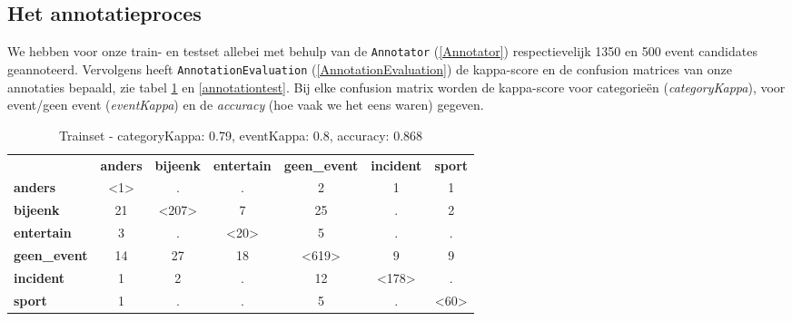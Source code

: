 \documentclass[a4paper,10pt,titlepage]{article}
\def\ss{\subsection}                          %
\def\ttt{\texttt}                             %
\def\it{\textit}                              %
\begin{document}
{{\ss{Het annotatieproces}

We hebben voor onze train- en testset allebei met behulp van de \ttt{Annotator} (\ref{Annotator})
respectievelijk 1350 en 500 event candidates geannoteerd. Vervolgens heeft \ttt{AnnotationEvaluation} (\ref{AnnotationEvaluation}) 
de kappa-score en de confusion matrices van onze annotaties bepaald, zie tabel \ref{annotationtrain} en \ref{annotationtest}.
Bij elke confusion matrix worden de kappa-score voor categorie\"en (\it{categoryKappa}), voor event/geen event (\it{eventKappa}) en
de \it{accuracy} (hoe vaak we het eens waren) gegeven.

\begin{table}[H]
\centering
\begin{tabular}{lcccccc}
 & \multicolumn{1}{l}{\textbf{anders}} & \multicolumn{1}{l}{\textbf{bijeenk}} & \multicolumn{1}{l}{\textbf{entertain}} & \multicolumn{1}{l}{\textbf{geen\_event}} & \multicolumn{1}{l}{\textbf{incident}} & \multicolumn{1}{l}{\textbf{sport}} \\ \cline{2-7} 
\multicolumn{1}{l|}{\textbf{anders}} & \multicolumn{1}{c|}{\textless1\textgreater} & \multicolumn{1}{c|}{.} & \multicolumn{1}{c|}{.} & \multicolumn{1}{c|}{2} & \multicolumn{1}{c|}{1} & \multicolumn{1}{c|}{1} \\ \cline{2-7} 
\multicolumn{1}{l|}{\textbf{bijeenk}} & \multicolumn{1}{c|}{21} & \multicolumn{1}{c|}{\textless207\textgreater} & \multicolumn{1}{c|}{7} & \multicolumn{1}{c|}{25} & \multicolumn{1}{c|}{.} & \multicolumn{1}{c|}{2} \\ \cline{2-7} 
\multicolumn{1}{l|}{\textbf{entertain}} & \multicolumn{1}{c|}{3} & \multicolumn{1}{c|}{.} & \multicolumn{1}{c|}{\textless20\textgreater} & \multicolumn{1}{c|}{5} & \multicolumn{1}{c|}{.} & \multicolumn{1}{c|}{.} \\ \cline{2-7} 
\multicolumn{1}{l|}{\textbf{geen\_event}} & \multicolumn{1}{c|}{14} & \multicolumn{1}{c|}{27} & \multicolumn{1}{c|}{18} & \multicolumn{1}{c|}{\textless619\textgreater} & \multicolumn{1}{c|}{9} & \multicolumn{1}{c|}{9} \\ \cline{2-7} 
\multicolumn{1}{l|}{\textbf{incident}} & \multicolumn{1}{c|}{1} & \multicolumn{1}{c|}{2} & \multicolumn{1}{c|}{.} & \multicolumn{1}{c|}{12} & \multicolumn{1}{c|}{\textless178\textgreater} & \multicolumn{1}{c|}{.} \\ \cline{2-7} 
\multicolumn{1}{l|}{\textbf{sport}} & \multicolumn{1}{c|}{1} & \multicolumn{1}{c|}{.} & \multicolumn{1}{c|}{.} & \multicolumn{1}{c|}{5} & \multicolumn{1}{c|}{.} & \multicolumn{1}{c|}{\textless60\textgreater} \\ \cline{2-7} 
\end{tabular}
\caption{Trainset - categoryKappa: 0.79, eventKappa: 0.8, accuracy: 0.868}\label{annotationtrain}
\end{table}

}}
\end{document}
